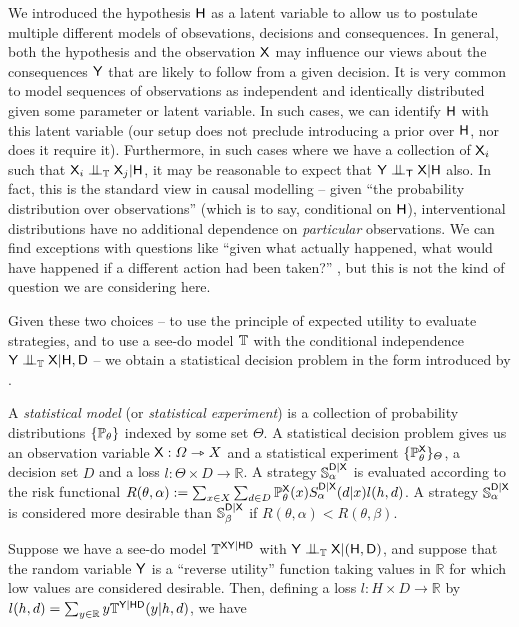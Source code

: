We introduced the hypothesis $\mathsf{H}$ as a latent variable to allow us to postulate multiple different models of obsevations, decisions and consequences. In general, both the hypothesis and the observation $\mathsf{X}$ may influence our views about the consequences $\mathsf{Y}$ that are likely to follow from a given decision. It is very common to model sequences of observations as independent and identically distributed given some parameter or latent variable. In such cases, we can identify $\mathsf{H}$ with this latent variable (our setup does not preclude introducing a prior over $\mathsf{H}$, nor does it require it). Furthermore, in such cases where we have a collection of $\mathsf{X}_i$ such that $\RV{X}_i\CI_{\model{T}} \RV{X}_j|\RV{H}$, it may be reasonable to expect that $\RV{Y} \CI_{\RV{T}} \RV{X}|\RV{H}$ also. In fact, this is the standard view in causal modelling -- given ``the probability distribution over observations'' (which is to say, conditional on $\mathsf{H}$), interventional distributions have no additional dependence on \emph{particular} observations. We can find exceptions with questions like ``given what actually happened, what would have happened if a different action had been taken?'' \citep{pearl_causality:_2009,tian_probabilities_2000,mueller_causes_2021}, but this is not the kind of question we are considering here.

Given these two choices -- to use the principle of expected utility to evaluate strategies, and to use a see-do model $\mathbb{T}$ with the conditional independence $\RV{Y}\CI_{\model{T}} \RV{X}|\RV{H,D}$ -- we obtain a statistical decision problem in the form introduced by \citet{wald_statistical_1950}.

A \emph{statistical model} (or \emph{statistical experiment}) is a collection of probability distributions $\{\mathbb{P}_\theta\}$ indexed by some set $\Theta$. A statistical decision problem gives us an observation variable $\mathsf{X}:\Omega\rightarrowtriangle X$ and a statistical experiment $\{\mathbb{P}^{\mathsf{X}}_\theta\}_\Theta$, a decision set $D$ and a loss $l:\Theta\times D\to \mathbb{R}$. A strategy $\mathbb{S}^{\mathsf{D}|\mathsf{X}}_\alpha$ is evaluated according to the risk functional $R(\theta,\alpha):=\sum_{x\in X}\sum_{d\in D} \mathbb{P}^{\mathsf{X}}_\theta(x) S^{\mathsf{D}|\mathsf{X}}_\alpha (d|x) l(h,d)$. A strategy $\mathbb{S}^{\mathsf{D}|\mathsf{X}}_\alpha$ is considered more desirable than $\mathbb{S}^{\mathsf{D}|\mathsf{X}}_\beta$ if $R(\theta,\alpha)<R(\theta,\beta)$.

Suppose we have a see-do model $\mathbb{T}^{\mathsf{X}\mathsf{Y}|\mathsf{HD}}$ with $\RV{Y}\CI_{\model{T}} \RV{X}|(\RV{H,D})$, and suppose that the random variable $\mathsf{Y}$ is a ``reverse utility'' function taking values in $\mathbb{R}$ for which low values are considered desirable. Then, defining a loss $l:H\times D\to \mathbb{R}$ by $l(h,d) = \sum_{y\in \mathbb{R}} y\mathbb{T}^{\mathsf{Y}|\mathsf{H}\mathsf{D}}(y|h,d)$, we have 

